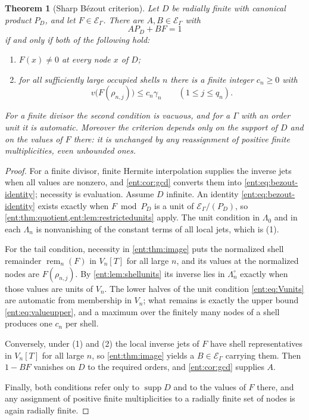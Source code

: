 \documentclass[11pt]{article}
\newtheorem{theorem}{Theorem}[section]
\theoremstyle{plain}
\theoremstyle{plain}
\theoremstyle{plain}
\theoremstyle{definition}
\theoremstyle{definition}
\theoremstyle{definition}
\theoremstyle{definition}
\theoremstyle{remark}
\newcommand{\E}{\mathcal E_\Gamma}
\DeclareMathOperator{\supp}{supp}\DeclareMathOperator{\lc}{lc}
\DeclareMathOperator{\remp}{rem}\DeclareMathOperator{\Res}{Res}
\begin{document}
\begin{theorem}[Sharp B\'ezout criterion]\label{ent:thm:bezout-criterion}
Let $D$ be radially finite with canonical product $P_D$, and let $F\in\E$.
There are $A,B\in\E$ with
\begin{equation}\label{ent:eq:bezout-identity}
 AP_D+BF=1
\end{equation}
if and only if both of the following hold:
\begin{enumerate}[label=\textnormal{(\arabic*)},leftmargin=2em]
\item $F(x)\ne0$ at every node $x$ of $D$;
\item for all sufficiently large occupied shells $n$ there is a finite
integer $c_n\ge0$ with
\begin{equation}\label{ent:eq:valueupper}
 v\bigl(F(\rho_{n,j})\bigr)\le c_n\gamma_n\qquad(1\le j\le q_n).
\end{equation}
\end{enumerate}
For a finite divisor the second condition is vacuous, and for a $\Gamma$ with
an order unit it is automatic. Moreover the criterion depends only on the
support of $D$ and on the values of $F$ there: it is unchanged by any
reassignment of positive finite multiplicities, even unbounded ones.
\end{theorem}
\begin{proof}
For a finite divisor, finite Hermite interpolation supplies the inverse jets
when all values are nonzero, and \cref{ent:cor:gcd} converts them into
\eqref{ent:eq:bezout-identity}; necessity is evaluation. Assume $D$ infinite.
An identity \eqref{ent:eq:bezout-identity} exists exactly when $F\bmod P_D$ is
a unit of $\E/(P_D)$, so \cref{ent:thm:quotient,ent:lem:restrictedunits}
apply. The unit condition in $\Lambda_0$ and in each $\Lambda_n$ is
nonvanishing of the constant terms of all local jets, which is (1).

For the tail condition, necessity in \cref{ent:thm:image} puts the normalized
shell remainder $\remp_n(F)$ in $V_n[T]$ for all large $n$, and its values at
the normalized nodes are $F(\rho_{n,j})$. By \cref{ent:lem:shellunits} its
inverse lies in $\Lambda_n^\circ$ exactly when those values are units of
$V_n$. The lower halves of the unit condition \eqref{ent:eq:Vunits} are
automatic from membership in $V_n$; what remains is exactly the upper bound
\eqref{ent:eq:valueupper}, and a maximum over the finitely many nodes of a
shell produces one $c_n$ per shell.

Conversely, under (1) and (2) the local inverse jets of $F$ have shell
representatives in $V_n[T]$ for all large $n$, so \cref{ent:thm:image} yields
a $B\in\E$ carrying them. Then $1-BF$ vanishes on $D$ to the required orders,
and \cref{ent:cor:gcd} supplies $A$.

Finally, both conditions refer only to $\supp D$ and to the values of $F$
there, and any assignment of positive finite multiplicities to a radially
finite set of nodes is again radially finite.
\end{proof}
\end{document}
